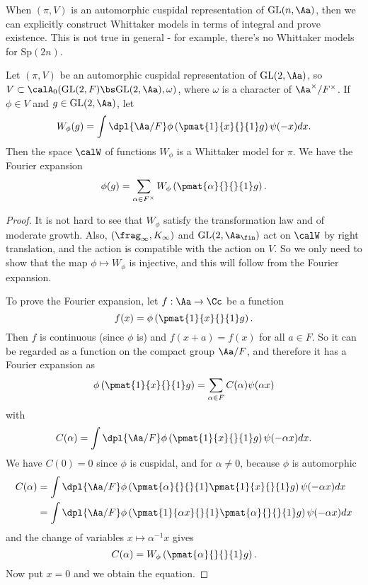 When $(\pi, V)$ is an automorphic cuspidal representation of $\GL(n, \Aa)$, then we can explicitly construct Whittaker models in terms of integral and prove existence. 
This is not true in general - for example, there's no Whittaker models for $\mathrm{Sp}(2n)$. 
\begin{theorem}
Let $(\pi, V)$ be an automorphic cuspidal representation of $\GL(2, \Aa)$, so $V\subset \calA_{0}(\GL(2, F)\bs \GL(2, \Aa), \omega)$, where $\omega$ is a character of $\Aa^{\times}/F^{\times}$. 
If $\phi\in V$ and $g\in \GL(2, \Aa)$, let 
$$
W_{\phi}(g) = \int\dpl{\Aa/F}\phi\left( \pmat{1}{x}{}{1}g\right) \psi(-x)dx. 
$$
Then the space $\calW$ of functions $W_{\phi}$ is a Whittaker model for $\pi$. 
We have the Fourier expansion 
$$
\phi(g) = \sum_{\alpha\in F^{\times}} W_{\phi} \left( \pmat{\alpha}{}{}{1}g\right).
$$
\end{theorem}
\begin{proof}
It is not hard to see that $W_{\phi}$ satisfy the transformation law and of moderate growth. 
Also, $(\frag_\infty, K_\infty)$ and $\GL(2, \Aa_{\fin})$ act on $\calW$ by right translation, and the action is compatible with the action on $V$. 
So we only need to show that the map $\phi\mapsto W_{\phi}$ is injective, and this will follow from the Fourier expansion. 

To prove the Fourier expansion, let $f:\Aa \to \Cc$ be a function 
$$
f(x) = \phi\left( \pmat{1}{x}{}{1} g\right). 
$$
Then $f$ is continuous (since $\phi$ is) and $f(x+a) = f(x)$ for all $a\in F$. 
So it can be regarded as a function on the compact group $\Aa/F$, and therefore it has a Fourier expansion as
$$
\phi\left( \pmat{1}{x}{}{1} g\right) = \sum_{\alpha\in F} C(\alpha) \psi(\alpha x)
$$
with 
$$
C(\alpha) = \int\dpl{\Aa/F} \phi\left( \pmat{1}{x}{}{1} g\right) \psi(-\alpha x)dx. 
$$
We have $C(0) = 0$ since $\phi$ is cuspidal, and for $\alpha \neq 0$, because $\phi$ is automorphic
\begin{align*}
C(\alpha) &= \int\dpl{\Aa/F} \phi\left( \pmat{\alpha}{}{}{1} \pmat{1}{x}{}{1} g\right) \psi(-\alpha x) dx \\
&= \int\dpl{\Aa/F} \phi\left( \pmat{1}{\alpha x}{}{1} \pmat{\alpha}{}{}{1} g\right) \psi(-\alpha x) dx
\end{align*}
and the change of variables $x\mapsto \alpha^{-1} x$ gives 
$$
C(\alpha) = W_{\phi}\left(\pmat{\alpha}{}{}{1} g\right). 
$$
Now put $x = 0$ and we obtain the equation. 
\end{proof}

